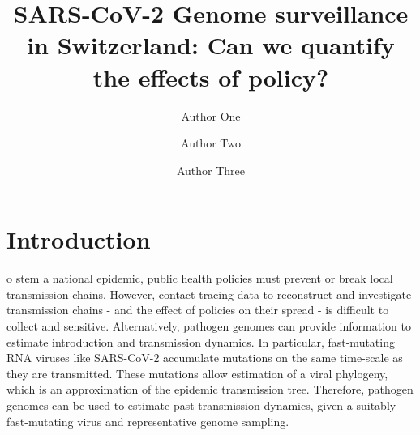 \documentclass[9pt,twocolumn,twoside,lineno]{pnas-new}
\title{SARS-CoV-2 Genome surveillance in Switzerland: Can we quantify the effects of policy?}https://www.overleaf.com/project/6051a5c9217a5042fadf7d8f
\author[a,c,1]{Author One}
\author[b,1,2]{Author Two}
\author[a]{Author Three}
\affil[a]{Affiliation One}
\affil[b]{Affiliation Two}
\affil[c]{Affiliation Three}
\begin{document}
\maketitle
\thispagestyle{firststyle}



\section{Introduction}

o stem a national epidemic, public health policies must prevent or break local transmission chains. However, contact tracing data to reconstruct and investigate transmission chains - and the effect of policies on their spread - is difficult to collect and sensitive. Alternatively, pathogen genomes can provide information to estimate introduction and transmission dynamics. In particular, fast-mutating RNA viruses like SARS-CoV-2 accumulate mutations on the same time-scale as they are transmitted. These mutations allow estimation of a viral phylogeny, which is an approximation of the epidemic transmission tree. Therefore, pathogen genomes can be used to estimate past transmission dynamics, given a suitably fast-mutating virus and representative genome sampling.
\end{document}

